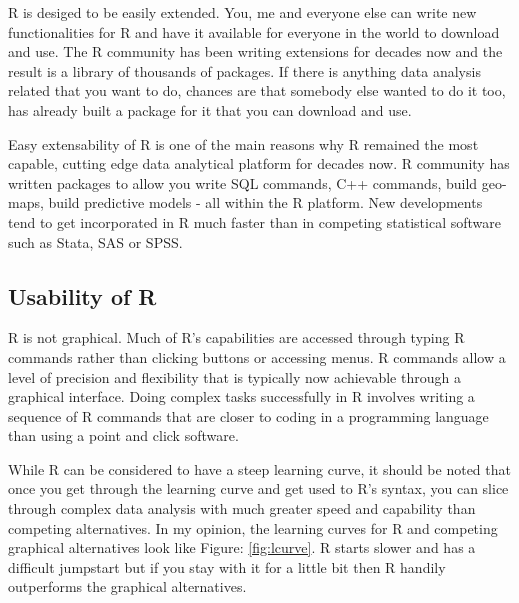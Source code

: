 \documentclass[11pt, letterpaper, twoside]{memoir}\usepackage{knitr}
\begin{document}
R is desiged to be easily extended. You, me and everyone else can write new functionalities for R and have it available for everyone in the world to download and use. The R community has been writing extensions for decades now and the result is a library of thousands of packages. If there is anything data analysis related that you want to do, chances are that somebody else wanted to do it too, has already built a package for it that you can download and use. 

Easy extensability of R is one of the main reasons why R remained the most capable, cutting edge data analytical platform for decades now. R community has written packages to allow you write SQL commands, C++ commands, build geo-maps, build predictive models - all within the R platform. New developments tend to get incorporated in R much faster than in competing statistical software such as Stata, SAS or SPSS.     

\subsection{Usability of R}

R is not graphical. Much of R's capabilities are accessed through typing R commands rather than clicking buttons or accessing menus. R commands allow a level of precision and flexibility that is typically now achievable through a graphical interface. Doing complex tasks successfully in R involves writing a sequence of R commands that are closer to coding in a programming language than using a point and click software.

While R can be considered to have a steep learning curve, it should be noted that once you get through the learning curve and get used to R's syntax, you can slice through complex data analysis with much greater speed and capability than competing alternatives. In my opinion, the learning curves for R and competing graphical alternatives look like Figure: \ref{fig:lcurve}. R starts slower and has a difficult jumpstart but if you stay with it for a little bit then R handily outperforms the graphical alternatives.
\end{document}
